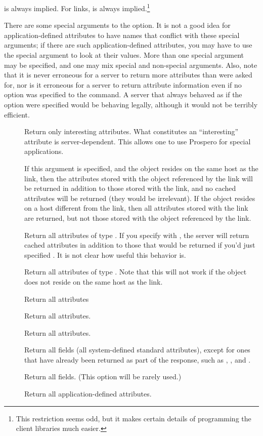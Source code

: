  is always implied.  For 
links,  is always implied.\footnote{
	This restriction seems odd, but it makes certain details of
programming the client libraries much easier.} 

There are some special arguments to the
 option.  It is not a good idea for application-defined
attributes to have names that conflict with these special arguments; if
there are such application-defined attributes, you may have to use the
 special argument to look at their values.  More than one
special argument may be specified, and one may mix special and
non-special arguments.  Also, note that it is never erroneous
for a server to return more attributes
than were asked for, nor is it erroneous for a server to return
attribute information even if no  option was specified
to the  command.  A server that always behaved as if the
 option were specified would be behaving
legally, although it would not be terribly efficient. 

\begin{description}
  \item[] Return only interesting attributes.  What
	constitutes an ``interesting'' attribute is server-dependent.
	This allows one to use Prospero for special applications.
  \item[] If this argument is specified, and the object resides
on the same host as 
the link, then the attributes stored with the object referenced by the
link will be returned in addition to those stored with the link, and
no cached attributes will be returned (they would be irrelevant).  If
the object resides on a host different from the link, then all
attributes stored with the link are returned, but not those stored
with the object referenced by the link.
   \item[] Return all attributes of type .
If you specify  with , the server will return cached
attributes in addition to those that would be returned if you'd just
specified .  It is not clear how useful this behavior is.
   \item[] Return all attributes of type .  Note that
this will not work if the object does not reside on the same host as
the link.
   \item[] Return all  attributes
   \item[] Return all  attributes.
   \item[] Return all  attributes.
   \item[] Return all fields (all system-defined standard
attributes), except for ones that have already been returned as part of
the  response, such as , , and
.
   \item[] Return all fields.  (This option will be
rarely used.)
   \item[] Return all application-defined
attributes.
\end{description}

